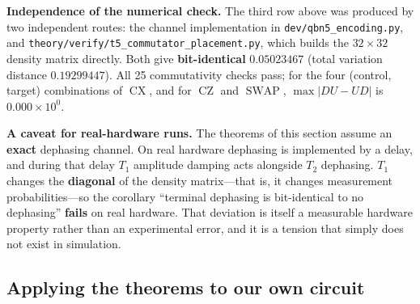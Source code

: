 \documentclass{article}
\begin{document}
\begin{table}[t]
\centering
\caption{Measurement agrees with the theorems. The first two rows differ
from the third by 15 orders of magnitude---exactly the gap between a
zero guaranteed by a theorem and a real physical effect.}
\end{table}


\textbf{Independence of the numerical check.} The third row above was
produced by two independent routes: the channel implementation in
\texttt{dev/\allowbreak qbn5\_\allowbreak encoding.py}, and
\texttt{theory/\allowbreak verify/\allowbreak t5\_\allowbreak commutator\_\allowbreak placement.py}, which builds the
\(32 \times 32\) density matrix directly. Both give
\textbf{bit-identical} \(0.05023467\) (total variation distance
\(0.19299447\)). All 25 commutativity checks pass; for the four
(control, target) combinations of \(\operatorname{CX}\), and for
\(\operatorname{CZ}\) and \(\operatorname{SWAP}\), \(\max|DU - UD|\) is
\(0.000 \times 10^{0}\).

\textbf{A caveat for real-hardware runs.} The theorems of this section
assume an \textbf{exact} dephasing channel. On real hardware dephasing
is implemented by a delay, and during that delay \(T_{1}\) amplitude
damping acts alongside \(T_{2}\) dephasing. \(T_{1}\) changes the
\textbf{diagonal} of the density matrix---that is, it changes
measurement probabilities---so the corollary ``terminal dephasing is
bit-identical to no dephasing'' \textbf{fails} on real hardware. That
deviation is itself a measurable hardware property rather than an
experimental error, and it is a tension that simply does not exist in
simulation.

\subsection{Applying the theorems to our own circuit}
\end{document}

